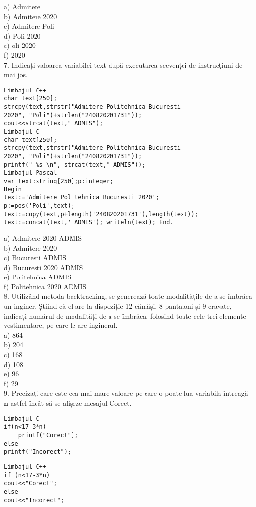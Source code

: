 a) Admitere\\
b) Admitere 2020\\
c) Admitere Poli\\
d) Poli 2020\\
e) oli 2020\\
f) 2020\\
7. Indicați valoarea variabilei text după executarea secvenței de instrucţiuni de mai jos.

\begin{verbatim}
Limbajul C++
char text[250];
strcpy(text,strstr("Admitere Politehnica Bucuresti
2020", "Poli")+strlen("240820201731"));
cout<<strcat(text," ADMIS");
Limbajul C
char text[250];
strcpy(text,strstr("Admitere Politehnica Bucuresti
2020", "Poli")+strlen("240820201731"));
printf(" %s \n", strcat(text," ADMIS"));
Limbajul Pascal
var text:string[250];p:integer;
Begin
text:='Admitere Politehnica Bucuresti 2020';
p:=pos('Poli',text);
text:=copy(text,p+length('240820201731'),length(text));
text:=concat(text,' ADMIS'); writeln(text); End.
\end{verbatim}

a) Admitere 2020 ADMIS\\
b) Admitere 2020\\
c) Bucuresti ADMIS\\
d) Bucuresti 2020 ADMIS\\
e) Politehnica ADMIS\\
f) Politehnica 2020 ADMIS\\
8. Utilizând metoda backtracking, se generează toate modalitățile de a se îmbrăca un inginer. Ș̦tiind că el are la dispoziție 12 cămăși, 8 pantaloni și 9 cravate, indicați numărul de modalități de a se îmbrăca, folosind toate cele trei elemente vestimentare, pe care le are inginerul.\\
a) 864\\
b) 204\\
c) 168\\
d) 108\\
e) 96\\
f) 29\\
9. Precizați care este cea mai mare valoare pe care o poate lua variabila întreagă $\mathbf{n}$ astfel încât să se afișeze mesajul Corect.

\begin{verbatim}
Limbajul C
if(n<17-3*n)
    printf("Corect");
else
printf("Incorect");
\end{verbatim}

\begin{verbatim}
Limbajul C++
if (n<17-3*n)
cout<<"Corect";
else
cout<<"Incorect";
\end{verbatim}

